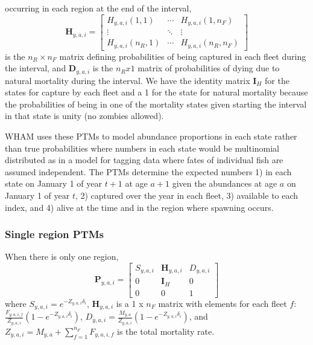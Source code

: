 \documentclass[
]{article}
\begin{document}
occurring in each region at the end of the interval, \begin{equation*} 
  \mathbf{H}_{y,a,i} = 
  \begin{bmatrix}
    H_{y,a,i}(1,1) & \cdots & H_{y,a,i}(1,n_F) \\
    \vdots & \ddots & \vdots \\
    H_{y,a,i}(n_R,1) & \cdots & H_{y,a,i}(n_R,n_F)
  \end{bmatrix}
\end{equation*} is the \(n_R \times n_F\) matrix defining probabilities
of being captured in each fleet during the interval, and
\(\mathbf{D}_{y,a,i}\) is the \(n_R x 1\) matrix of probabilities of
dying due to natural mortality during the interval. We have the identity
matrix \(\mathbf{I}_{H}\) for the states for capture by each fleet and a
1 for the state for natural mortality because the probabilities of being
in one of the mortality states given starting the interval in that state
is unity (no zombies allowed).

WHAM uses these PTMs to model abundance proportions in each state rather
than true probabilities where numbers in each state would be multinomial
distributed as in a model for tagging data where fates of individual
fish are assumed independent. The PTMs determine the expected numbers 1)
in each state on January 1 of year \(t+1\) at age \(a+1\) given the
abundances at age \(a\) on January 1 of year \(t\), 2) captured over the
year in each fleet, 3) available to each index, and 4) alive at the time
and in the region where spawning occurs.

\hypertarget{single-region-ptms}{%
\subsubsection*{Single region PTMs}\label{single-region-ptms}}

When there is only one region, \begin{equation}\label{eq:ptm_1_region}
\mathbf{P}_{y,a,i} = 
  \begin{bmatrix}
     S_{y,a,i} & \mathbf{H}_{y,a,i} & D_{y,a,i} \\
     0 & \mathbf{I}_{H} & 0\\
     0 & 0 & 1
  \end{bmatrix}
\end{equation} where \(S_{y,a,i} = e^{-Z_{y,a,i}\delta_i}\),
\(\mathbf{H}_{y,a,i}\) is a 1 x \(n_F\) matrix with elements for each
fleet \(f\):
\(\frac{F_{y,a,i,f}}{Z_{y,a,i}}\left(1 - e^{-Z_{y,a,i}\delta_i}\right)\),
\(D_{y,a,i} = \frac{M_{y,a}}{Z_{y,a,i}}\left(1 - e^{-Z_{y,a,i}\delta_i}\right)\),
and \(Z_{y,a,i} = M_{y,a} + \sum^{n_F}_{f=1} F_{y,a,i,f}\) is the total
mortality rate.
\end{document}
